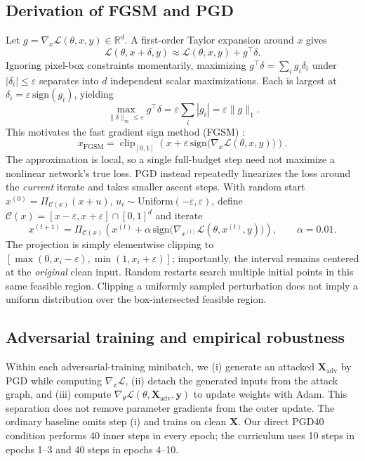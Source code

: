 \documentclass[11pt,a4paper]{article}
\newcommand{\R}{\mathbb{R}}
\newcommand{\vect}[1]{\mathbf{#1}}
\begin{document}
\subsection{Derivation of FGSM and PGD}
Let $g=\nabla_x\mathcal{L}(\theta,x,y)\in\R^d$. A first-order Taylor expansion around $x$ gives
\begin{equation}
\mathcal{L}(\theta,x+\delta,y)\approx \mathcal{L}(\theta,x,y)+g^\top\delta.
\end{equation}
Ignoring pixel-box constraints momentarily, maximizing $g^\top\delta=\sum_i g_i\delta_i$ under $|\delta_i|\leq\varepsilon$ separates into $d$ independent scalar maximizations. Each is largest at $\delta_i=\varepsilon\,\mathrm{sign}(g_i)$, yielding
\begin{equation}
\max_{\|\delta\|_\infty\leq\varepsilon}g^\top\delta
=\varepsilon\sum_i|g_i|=\varepsilon\|g\|_1.
\label{eq:dual}
\end{equation}
This motivates the fast gradient sign method (FGSM) \citep{goodfellow2015explaining}:
\begin{equation}
 x_{\mathrm{FGSM}}=\operatorname{clip}_{[0,1]}\!\left(x+\varepsilon\,\mathrm{sign}\bigl(\nabla_x\mathcal L(\theta,x,y)\bigr)\right).
\label{eq:fgsm}
\end{equation}
The approximation is local, so a single full-budget step need not maximize a nonlinear network's true loss. PGD instead repeatedly linearizes the loss around the \emph{current} iterate and takes smaller ascent steps. With random start $x^{(0)}=\Pi_{\mathcal C(x)}(x+u)$, $u_i\sim\mathrm{Uniform}(-\varepsilon,\varepsilon)$, define $\mathcal C(x)=[x-\varepsilon,x+\varepsilon]\cap[0,1]^d$ and iterate
\begin{equation}
x^{(t+1)}=\Pi_{\mathcal C(x)}\!\left(x^{(t)}+\alpha\,\mathrm{sign}\bigl(\nabla_{x^{(t)}}\mathcal L(\theta,x^{(t)},y)\bigr)\right),\qquad\alpha=0.01.
\label{eq:pgd}
\end{equation}
The projection is simply elementwise clipping to $[\max(0,x_i-\varepsilon),\min(1,x_i+\varepsilon)]$; importantly, the interval remains centered at the \emph{original} clean input. Random restarts search multiple initial points in this same feasible region. Clipping a uniformly sampled perturbation does not imply a uniform distribution over the box-intersected feasible region.

\subsection{Adversarial training and empirical robustness}
Within each adversarial-training minibatch, we (i) generate an attacked $\vect X_{\mathrm{adv}}$ by PGD while computing $\nabla_x\mathcal L$, (ii) detach the generated inputs from the attack graph, and (iii) compute $\nabla_\theta\mathcal L(\theta,\vect X_{\mathrm{adv}},\vect y)$ to update weights with Adam. This separation does not remove parameter gradients from the outer update. The ordinary baseline omits step (i) and trains on clean $\vect X$. Our direct PGD40 condition performs 40 inner steps in every epoch; the curriculum uses 10 steps in epochs 1--3 and 40 steps in epochs 4--10.
\end{document}

